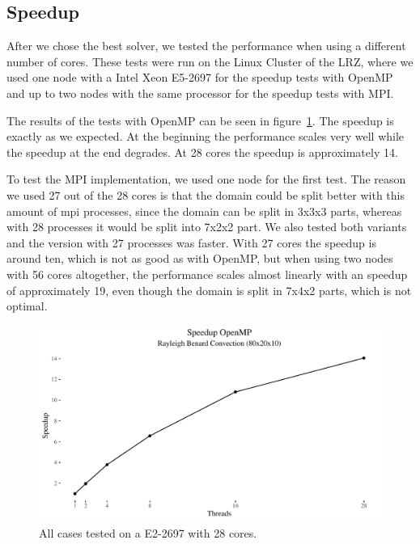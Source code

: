 \documentclass{article}%
\begin{document}
\subsection{Speedup}
After we chose the best solver, we tested the performance when using a different number of cores. These tests were run on the Linux Cluster of the LRZ, where we used one node with a Intel Xeon E5-2697 for the speedup tests with OpenMP and up to two nodes with the same processor for the speedup tests with MPI.

The results of the tests with OpenMP can be seen in figure~\ref{fig:speedup_openmp}. The speedup is exactly as we expected. At the beginning the performance scales very well while the speedup at the end degrades. At 28 cores the speedup is approximately 14.

To test the MPI implementation, we used one node for the first test. The reason we used 27 out of the 28 cores is that the domain could be split better with this amount of mpi processes, since the domain can be split in 3x3x3 parts, whereas with 28 processes it would be split into 7x2x2 part. We also tested both variants and the version with 27 processes was faster. With 27 cores the speedup is around ten, which is not as good as with OpenMP, but when using two nodes with 56 cores altogether, the performance scales almost linearly with an speedup of approximately 19, even though the domain is split in 7x4x2 parts, which is not optimal.


\begin{figure}[htbp]
\centering
\includegraphics[width=1\linewidth]{../tests/graphs/speedup_OpenMP_double.pdf}
\caption{All cases tested on a E2-2697 with 28 cores.}
\label{fig:speedup_openmp}
\end{figure}
\end{document}

